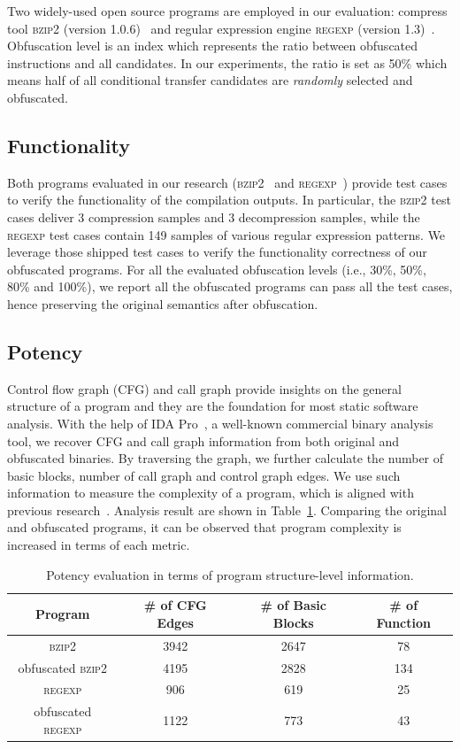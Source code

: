 \documentclass[lnicst]{svmultln}
\begin{document}
Two widely-used open source programs are employed in our evaluation: compress
tool \textsc{bzip2} (version 1.0.6)~\cite{bzip2} and regular expression engine
\textsc{regexp} (version 1.3)~\cite{slre}. Obfuscation level is an index which
represents the ratio between obfuscated instructions and all candidates. In our
experiments, the ratio is set as 50\% which means half of all conditional
transfer candidates are \textit{randomly} selected and obfuscated.

\subsection{Functionality}
Both programs evaluated in our research (\textsc{bzip2}~\cite{bzip2} and
\textsc{regexp}~\cite{slre}) provide test cases to verify the functionality of
the compilation outputs. In particular, the \textsc{bzip2} test cases deliver 3
compression samples and 3 decompression samples, while the \textsc{regexp} test
cases contain 149 samples of various regular expression patterns. We leverage
those shipped test cases to verify the functionality correctness of our
obfuscated programs. For all the evaluated obfuscation levels (i.e., 30\%, 50\%,
80\% and 100\%), we report all the obfuscated programs can pass all the test
cases, hence preserving the original semantics after obfuscation.

\subsection{Potency}
Control flow graph (CFG) and call graph provide insights on the general
structure of a program and they are the foundation for most static software
analysis. With the help of IDA Pro~\cite{ida}, a well-known commercial binary
analysis tool, we recover CFG and call graph information from both original and
obfuscated binaries. By traversing the graph, we further calculate the number of
basic blocks, number of call graph and control graph edges. We use such
information to measure the complexity of a program, which is aligned with
previous research~\cite{Chen}. Analysis result are shown in Table~\ref{tab:two}.
Comparing the original and obfuscated programs, it can be observed that program
complexity is increased in terms of each metric.

\begin{table}
  \centering
 \caption{Potency evaluation in terms of program structure-level information.}
 \label{tab:two}
 \begin{tabular}{|c|c|c|c|}
 \hline 
 \textbf{Program} & \textbf{\# of CFG Edges} & \textbf{\# of Basic Blocks} & \textbf{\# of Function} \\
 \hline
\textsc{bzip2} & 3942 & 2647 & 78 \\ 
 \hline
obfuscated \textsc{bzip2} & 4195 & 2828 & 134 \\
 \hline
\textsc{regexp} & 906 & 619 & 25 \\ 
 \hline
obfuscated \textsc{regexp} & 1122 & 773 & 43 \\
 \hline
\end{tabular}
\end{table}
\end{document}
